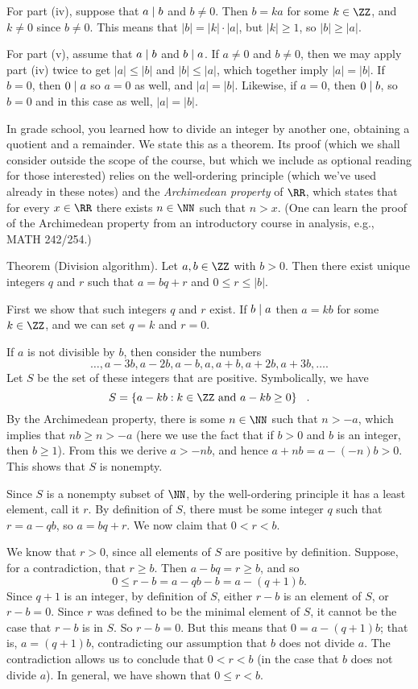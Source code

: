 For part (iv), suppose that $a\mid b$ and $b\ne 0$. Then $b = ka$ for some $k\in \ZZ$,
and $k\ne 0$ since $b\ne 0$. This means that $|b| = |k|\cdot |a|$, but $|k|\ge 1$,
so $|b|\ge |a|$.

For part (v), assume that $a\mid b$ and $b\mid a$. If $a\ne 0$ and $b\ne 0$, then we may apply
part (iv) twice to get $|a|\le |b|$ and $|b|\le |a|$, which together imply $|a| = |b|$. If $b=0$,
then $0\mid a$ so $a = 0$ as well, and $|a| = |b|$. Likewise, if $a = 0$, then $0\mid b$,
so $b=0$ and in this case as well, $|a| = |b|$.\slug

In grade school, you learned how to divide an integer by another one, obtaining a quotient and a remainder.
We state this as a theorem. Its proof (which we shall consider outside the scope of the course,
but which we include as optional reading for those interested)
relies on the well-ordering principle (which we've used
already in these notes)
and the {\it Archimedean property} of $\RR$, which states that for every $x\in \RR$ there
exists $n\in \NN$ such that $n > x$. (One can learn the proof of the Archimedean property from an introductory
course in analysis, e.g., {\mc MATH} 242/254.)

\parenproclaim Theorem {\advthm} (Division algorithm). Let $a,b\in \ZZ$ with $b> 0$. Then there
exist unique integers $q$ and $r$ such that $a = bq+r$ and $0\le r\le |b|$.

\noindent{}\enspace First we show that such integers $q$ and $r$
exist. If $b\mid a$ then $a = kb$ for some $k\in \ZZ$,
and we can set $q = k$ and $r = 0$.

If $a$ is not divisible by $b$, then consider the numbers
$$ \ldots, a - 3b, a-2b, a-b, a, a+b, a+2b, a+3b, \ldots.$$
Let $S$ be the set of these integers that are positive. Symbolically, we have
$$ S = \{a-kb : k\in \ZZ\ \hbox{and}\ a-kb\ge 0\}\phantom{D}.$$
By the Archimedean property, there is some $n\in \NN$ such that $n> -a$, which
implies that $nb \ge n > -a$ (here we use the fact that if $b>0$ and $b$ is an integer, then
$b\ge 1$). From this we derive $a > -nb$, and hence $a+nb = a - (-n)b > 0$. This shows
that $S$ is nonempty.

Since $S$ is a nonempty subset of $\NN$, by the well-ordering principle it has a least
element, call it $r$. By definition of $S$, there must be some integer $q$ such that
$r = a-qb$, so $a = bq + r$. We now claim that $0<r<b$.

We know that $r> 0$, since all elements of $S$ are positive by definition. Suppose,
for a contradiction, that $r\ge b$. Then $a - bq = r \ge b$, and so
$$0 \le r-b = a - qb - b = a-(q+1)b.$$
Since $q+1$ is an integer, by definition of $S$, either $r-b$ is an element of $S$,
or $r-b = 0$. Since $r$ was defined to be the minimal element of $S$, it cannot be the
case that $r-b$ is in $S$. So $r-b = 0$. But this means that $0 = a-(q+1)b$; that is,
$a = (q+1)b$, contradicting our assumption that $b$ does not divide $a$. The contradiction
allows us to conclude that $0<r<b$ (in the case that $b$ does not divide $a$). In general,
we have shown that $0\le r<b$.

